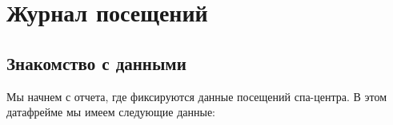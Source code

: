 \documentclass[
  letterpaper,
  DIV=11,
  numbers=noendperiod]{scrartcl}
\begin{document}

\hypertarget{ux436ux443ux440ux43dux430ux43b-ux43fux43eux441ux435ux449ux435ux43dux438ux439}{%
\chapter{Журнал
посещений}\label{ux436ux443ux440ux43dux430ux43b-ux43fux43eux441ux435ux449ux435ux43dux438ux439}}

\hypertarget{ux437ux43dux430ux43aux43eux43cux441ux442ux432ux43e-ux441-ux434ux430ux43dux43dux44bux43cux438}{%
\section{Знакомство с
данными}\label{ux437ux43dux430ux43aux43eux43cux441ux442ux432ux43e-ux441-ux434ux430ux43dux43dux44bux43cux438}}

Мы начнем с отчета, где фиксируются данные посещений спа-центра. В этом
датафрейме мы имеем следующие данные:
\end{document}
